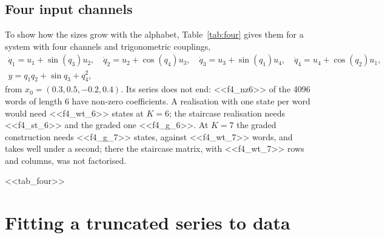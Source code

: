 \documentclass[11pt,a4paper]{article}
\theoremstyle{remark}
\begin{document}
\subsection{Four input channels}\label{sec:four}
To show how the sizes grow with the alphabet, Table~\ref{tab:four} gives them for a system with four channels and trigonometric couplings,
\begin{gather*}
\dot q_1=u_1+\sin(q_3)u_2,\quad \dot q_2=u_2+\cos(q_4)u_3,\quad \dot q_3=u_3+\sin(q_1)u_4,\quad \dot q_4=u_4+\cos(q_2)u_1,\\
y=q_1q_2+\sin q_3+q_4^2,
\end{gather*}
from $x_0=(0.3,0.5,-0.2,0.4)$.
Its series does not end: <<f4_nz6>> of the 4096 words of length 6 have non-zero coefficients.
A realisation with one state per word would need <<f4_wt_6>> states at $K=6$; the staircase realisation needs <<f4_st_6>> and the graded one <<f4_g_6>>.
At $K=7$ the graded construction needs <<f4_g_7>> states, against <<f4_wt_7>> words, and takes well under a second; there the staircase matrix, with <<f4_wt_7>> rows and columns, was not factorised.

\begin{table}[t]\centering\small
\caption{Sizes of the realisations of the four-channel series truncated at order $K$.}\label{tab:four}
<<tab_four>>
\end{table}

\section{Fitting a truncated series to data}\label{sec:regression}
\end{document}
